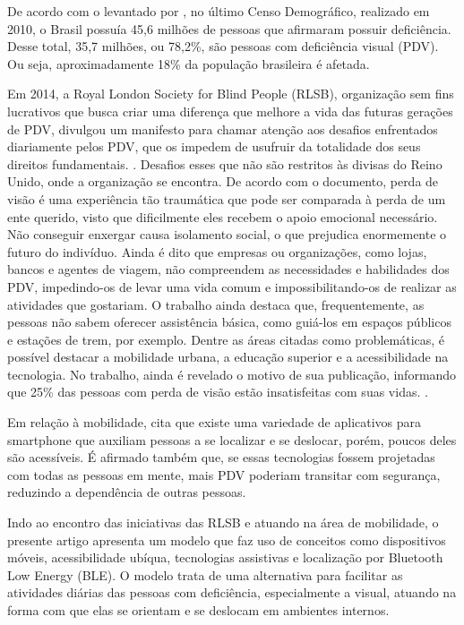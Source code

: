\documentclass[twoside,english,brazilian]{UNISINOSartigo}
\begin{document}
De acordo com o levantado por , no último Censo Demográfico, realizado em 2010, o Brasil possuía 45,6 milhões de pessoas que afirmaram possuir deficiência. Desse total, 35,7 milhões, ou 78,2\%, são pessoas com deficiência visual (PDV). Ou seja, aproximadamente 18\% da população brasileira é afetada.

Em 2014, a Royal London Society for Blind People (RLSB), organização sem fins lucrativos que busca criar uma diferença que melhore a vida das futuras gerações de PDV, divulgou um manifesto para chamar atenção aos desafios enfrentados diariamente pelos PDV, que os impedem de usufruir da totalidade dos seus direitos fundamentais. \cite{YouthManifesto}. Desafios esses que não são restritos às divisas do Reino Unido, onde a organização se encontra.
De acordo com o documento, perda de visão é uma experiência tão traumática que pode ser comparada à perda de um ente querido, visto que dificilmente eles recebem o apoio emocional necessário. Não conseguir enxergar causa isolamento social, o que prejudica enormemente o futuro do indivíduo. Ainda é dito que empresas ou organizações, como lojas, bancos e agentes de viagem, não compreendem as necessidades e habilidades dos PDV, impedindo-os de levar uma vida comum e impossibilitando-os de realizar as atividades que gostariam. O trabalho ainda destaca que, frequentemente, as pessoas não sabem oferecer assistência básica, como guiá-los em espaços públicos e estações de trem, por exemplo. Dentre as áreas citadas como problemáticas, é possível destacar a mobilidade urbana, a educação superior e a acessibilidade na tecnologia. No trabalho, ainda é revelado o motivo de sua publicação, informando que 25\% das pessoas com perda de visão estão insatisfeitas com suas vidas. \cite{YouthManifesto}.

Em relação à mobilidade,  cita que existe uma variedade de aplicativos para smartphone que auxiliam pessoas a se localizar e se deslocar, porém, poucos deles são acessíveis. É afirmado também que, se essas tecnologias fossem projetadas com todas as pessoas em mente, mais PDV poderiam transitar com segurança, reduzindo a dependência de outras pessoas.

Indo ao encontro das iniciativas das RLSB e atuando na área de mobilidade, o presente artigo apresenta um modelo que faz uso de conceitos como dispositivos móveis, acessibilidade ubíqua, tecnologias assistivas e localização por Bluetooth Low Energy (BLE). O modelo trata de uma alternativa para facilitar as atividades diárias das pessoas com deficiência, especialmente a visual, atuando na forma com que elas se orientam e se deslocam em ambientes internos.
\end{document}
